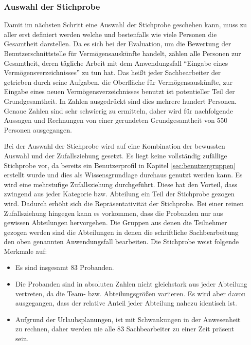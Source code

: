 
\subsubsection{Auswahl der Stichprobe}
Damit im nächsten Schritt eine Auswahl der Stichprobe geschehen kann, muss zu aller erst definiert werden welche und bestenfalls wie viele Personen die Gesamtheit darstellen. Da es sich bei der Evaluation, um die Bewertung der Benutzerschnittstelle für Vermögensauskünfte handelt, zählen alle Personen zur Gesamtheit, deren tägliche Arbeit mit dem Anwendungsfall \enquote{Eingabe eines Vermögensverzeichnisses} zu tun hat. Das heißt jeder Sachbearbeiter der getrieben durch seine Aufgaben, die Oberfläche für Vermögensauskünfte, zur Eingabe eines neuen Vermögensverzeichnisses benutzt ist potentieller Teil der Grundgesamtheit. In Zahlen ausgedrückt sind dies mehrere hundert Personen. Genaue Zahlen sind sehr schwierig zu ermitteln, daher wird für nachfolgende Aussagen und Rechnungen von einer gerundeten Grundgesamtheit von 550 Personen ausgegangen.

Bei der Auswahl der Stichprobe wird auf eine Kombination der bewussten Auswahl und der Zufallsziehung gesetzt. Es liegt keine vollständig zufällige Stichprobe vor, da bereits ein Benutzerprofil in Kapitel \ref{sec:benutzergruppen} erstellt wurde und dies als Wissensgrundlage durchaus genutzt werden kann. Es wird eine mehrstufige Zufallsziehung durchgeführt. Diese hat den Vorteil, dass zwingend aus jeder Kategorie bzw. Abteilung ein Teil der Stichprobe gezogen wird. Dadurch erhöht sich die Repräsentativität der Stichprobe. Bei einer reinen Zufallsziehung hingegen kann es vorkommen, dass die Probanden nur aus gewissen Abteilungen hervorgehen. Die Gruppen aus denen die Teilnehmer gezogen werden sind die Abteilungen in denen die schriftliche Sachbearbeitung den oben genannten Anwendungsfall bearbeiten. Die Stichprobe weist folgende Merkmale auf:
\begin{itemize}
    \item Es sind insgesamt 83 Probanden.
    \item Die Probanden sind in absoluten Zahlen nicht gleichstark aus jeder Abteilung vertreten, da die Team- bzw. Abteilungsgrößen variieren. Es wird aber davon ausgegangen, dass der relative Anteil jeder Abteilung nahezu identisch ist.
    \item Aufgrund der Urlaubsplanungen, ist mit Schwankungen in der Anwesenheit zu rechnen, daher werden nie alle 83 Sachbearbeiter zu einer Zeit präsent sein.
\end{itemize}

